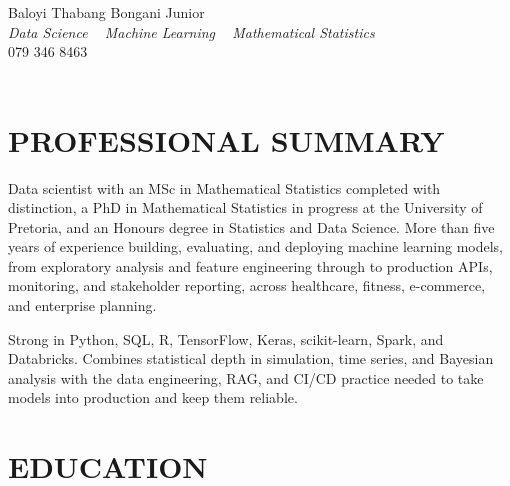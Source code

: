 \documentclass[letterpaper,11pt]{article}
\begin{document}


\begin{center}
    {\huge Baloyi Thabang Bongani Junior} \\ \vspace{2pt}
    {\large\textit{Data Science \textbar~ Machine Learning \textbar~ Mathematical Statistics}} \\ \vspace{4pt}
    {079 346 8463} ~\textbar~
    \href{mailto:Baloyibongani1@gmail.com}{\color{blue}{Baloyibongani1@gmail.com}} \\ \vspace{1pt}
    \href{https://www.linkedin.com/in/thabang-bongani-junior-baloyi-2622b0286/}{\color{blue}{linkedin.com/in/thabang-bongani-junior-baloyi}} ~\textbar~
    \href{https://github.com/thabangTheActuaryCoder}{\color{blue}{github.com/thabangTheActuaryCoder}}
    \vspace{-7pt}
\end{center}

\section{PROFESSIONAL SUMMARY}
\vspace{4pt}
{\small
\noindent
Data scientist with an MSc in Mathematical Statistics completed with distinction, a PhD in
Mathematical Statistics in progress at the University of Pretoria, and an Honours
degree in Statistics and Data Science. More than five years of experience building, evaluating, and
deploying machine learning models, from exploratory analysis and feature engineering through to
production APIs, monitoring, and stakeholder reporting, across healthcare, fitness, e-commerce,
and enterprise planning.

\vspace{4pt}

\noindent
Strong in Python, SQL, R, TensorFlow, Keras, scikit-learn, Spark, and Databricks. Combines
statistical depth in simulation, time series, and Bayesian analysis with the data engineering, RAG,
and CI/CD practice needed to take models into production and keep them reliable.
}
\vspace{-2pt}
\section{EDUCATION}
\vspace{4pt}
\end{document}
